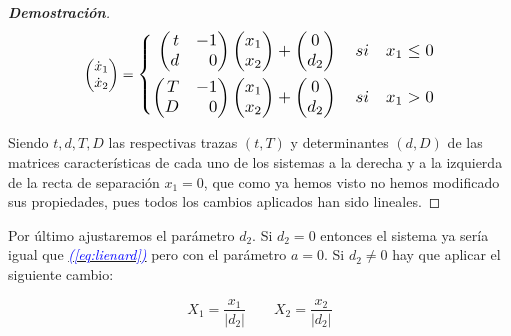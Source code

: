 \documentclass[12pt,a4paper]{report} %
\newcommand{\eref}[1]{\hyperref[#1]{\textcolor{blue}{\textit{(\ref*{#1})}}}}
\begin{document}
\begin{proof}[\textbf{Demostración}]
	\begin{equation}
		\begin{pmatrix*}[r]
			\dot{x}_1 \\ \dot{x}_2
		\end{pmatrix*}=
		\label{eq:lienard2}
		\scalebox{1.2}{$\displaystyle
			\left\{
			\begin{aligned}
				\begin{pmatrix*}[r]
					t & -1\\
					d & 0
				\end{pmatrix*}\begin{pmatrix*}[r]
				x_1 \\ x_2
				\end{pmatrix*}+\begin{pmatrix}
					0\\d_2
				\end{pmatrix} \quad si \quad x_1\leq 0 \\
				\begin{pmatrix*}[r]
					T & -1\\
					D & 0
				\end{pmatrix*}\begin{pmatrix*}[r]
				x_1 \\ x_2
				\end{pmatrix*}+\begin{pmatrix}
					0\\d_2
				\end{pmatrix} \quad si \quad x_1 > 0
			\end{aligned}
			\right. 
			$}
	\end{equation}\smallskip

	\noindent Siendo $t,d,T,D$ las respectivas trazas $(t,T)$ y determinantes $(d,D)$ de las matrices características de cada uno de los sistemas a la derecha y a la izquierda de la recta de separación $x_1=0$, que como ya hemos visto no hemos modificado sus propiedades, pues todos los cambios aplicados han sido lineales.
	
\end{proof}

\newpage

	 Por último ajustaremos el parámetro $d_2$. Si $d_2=0$ entonces el sistema ya sería igual que \eref{eq:lienard} pero con el parámetro $a=0$. Si $d_2\neq0$ hay que aplicar el siguiente cambio:
	
	\begin{equation}
		\label{eq:cambiod2}
		X_1=\frac{x_1}{|d_2|} \qquad X_2=\frac{x_2}{|d_2|}
	\end{equation}\smallskip
	
\end{document}

